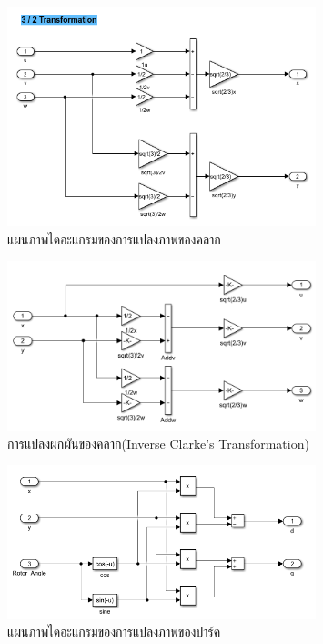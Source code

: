 \documentclass[11pt,a4paper]{article}
\begin{document}
\begin{figure}[H]
    \centering
    \includegraphics[width=0.8\textwidth]{clarke_trans.png}
    \caption{แผนภาพไดอะแกรมของการแปลงภาพของคลาก}
\end{figure}
\begin{figure}[H]
    \centering
    \includegraphics[width=0.8\textwidth]{inverse_clarke.png}
    \caption{การแปลงผกผันของคลาก(Inverse Clarke's Transformation)}
\end{figure}
\begin{figure}[H]
    \centering
    \includegraphics[width=0.8\textwidth]{park_trans.png}
    \caption{แผนภาพไดอะแกรมของการแปลงภาพของปาร์ค}
\end{figure}
\end{document}
